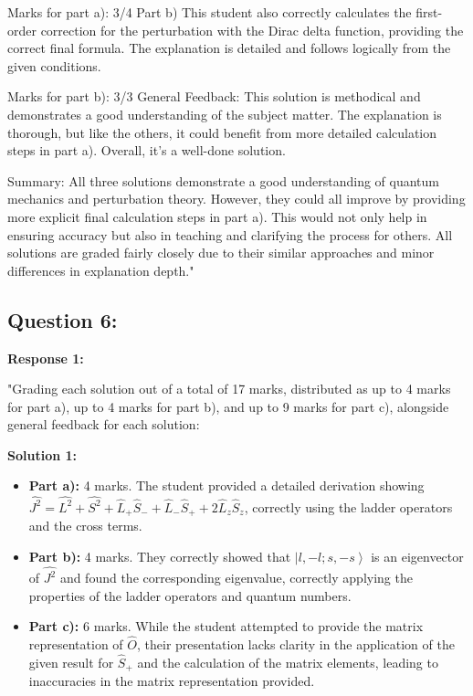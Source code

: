 \documentclass[a4paper,11pt]{article}
\begin{document}
Marks for part a): 3/4
Part b)
This student also correctly calculates the first-order correction for the perturbation with the Dirac delta function, providing the correct final formula. The explanation is detailed and follows logically from the given conditions.

Marks for part b): 3/3
General Feedback: This solution is methodical and demonstrates a good understanding of the subject matter. The explanation is thorough, but like the others, it could benefit from more detailed calculation steps in part a). Overall, it's a well-done solution.

Summary:
All three solutions demonstrate a good understanding of quantum mechanics and perturbation theory. However, they could all improve by providing more explicit final calculation steps in part a). This would not only help in ensuring accuracy but also in teaching and clarifying the process for others. All solutions are graded fairly closely due to their similar approaches and minor differences in explanation depth."

\subsection*{Question 6:}

\textbf{Response 1:}

"Grading each solution out of a total of 17 marks, distributed as up to 4 marks for part a), up to 4 marks for part b), and up to 9 marks for part c), alongside general feedback for each solution:

\textbf{Solution 1:}

\begin{itemize}
    \item \textbf{Part a):} 4 marks. The student provided a detailed derivation showing \( \hat{J^{2}} = \hat{L^{2}} + \hat{S^{2}} + \hat{L}_{+}\hat{S}_{-} + \hat{L}_{-}\hat{S}_{+} + 2\hat{L}_{z}\hat{S}_{z} \), correctly using the ladder operators and the cross terms.
    \item \textbf{Part b):} 4 marks. They correctly showed that \( \left|l, -l; s, -s \right> \) is an eigenvector of \( \hat{J^{2}} \) and found the corresponding eigenvalue, correctly applying the properties of the ladder operators and quantum numbers.
    \item \textbf{Part c):} 6 marks. While the student attempted to provide the matrix representation of \( \hat{O} \), their presentation lacks clarity in the application of the given result for \( \hat{S}_{+} \) and the calculation of the matrix elements, leading to inaccuracies in the matrix representation provided.
\end{itemize}
\end{document}

